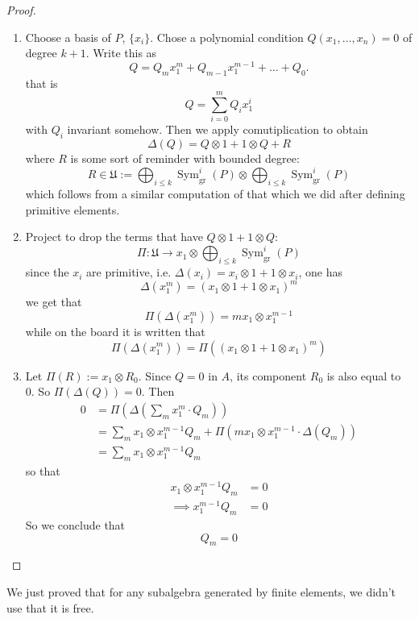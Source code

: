 \begin{proof}\leavevmode 
	\begin{enumerate}[label=\textbf{Step \arabic*}]
		\item Choose a basis of $P$, $\{x_i\}$. Chose a polynomial condition $Q(x_1,\ldots,x_n)=0$ of degree $k+1$. Write this as
			\[Q=Q_mx_1^m+Q_{m-1}x_1^{m-1}+\ldots+Q_0.\]
			that is
			\[Q=\sum_{i=0}^mQ_ix_1^i\]
			with $Q_i$ invariant somehow. Then we apply comutiplication to obtain
			\[\Delta(Q)=Q\otimes 1+1\otimes Q+R\]
			where $R$ is some sort of reminder with bounded degree:
			\[R\in\mathfrak{U}:=\bigoplus_{i\leq k} \operatorname{Sym}^i_{\operatorname{gr}}(P)\otimes \bigoplus_{i\leq k} \operatorname{Sym}_{\operatorname{gr}}^i(P)  \]
			which follows from a similar computation of that which we did after defining primitive elements.

			\item Project to drop the terms that have $Q\otimes 1+1\otimes Q$:
				\[\Pi:\mathfrak{U}\to x_1\otimes \bigoplus_{i\leq k}   \operatorname{Sym}^i_{\operatorname{gr}}(P)\]
				since the $x_i$ are primitive, i.e. $\Delta(x_i)=x_i\otimes 1+1\otimes x_i$, one has
				\[\Delta(x_1^m)=(x_1\otimes 1+1 \otimes x_1)^m\]
				we get that
				\[\Pi(\Delta(x_1^m))=mx_1\otimes x_1^{m-1}\]
				while on the board it is written that
				\[\Pi(\Delta(x_1^m))=\Pi((x_1\otimes 1+1\otimes x_1)^m)\]

			\item Let $\Pi(R):=x_1\otimes R_0$. Since $Q=0$ in $A$, its component $R_0$ is also equal to 0. So $\Pi(\Delta(Q))=0$. Then
				\begin{align*}
					0&=\Pi \left( \Delta \left( \sum_{m}x_1^m\cdot Q_m \right)  \right)\\
					 & =\sum_{m}x_1\otimes x_1^{m-1}Q_m+\Pi(mx_1\otimes x_1^{m-1}\cdot  \Delta(Q_m))\\
					& =\sum_{m}x_1\otimes x_1^{m-1}Q_m
				\end{align*}
				so that 
				\begin{align*}
					x_1\otimes x_1^{m-1}Q_m&=0\\
					\implies x_1^{m-1}Q_m&=0
				\end{align*}
				So we conclude that
				\[Q_m=0\]
		\end{enumerate}
	\end{proof}

\begin{remark}
	We just proved that for any subalgebra generated by finite elements, we didn't use that it is free.
\end{remark}

